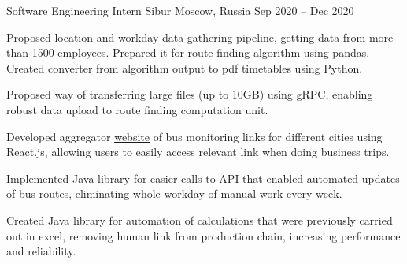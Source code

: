 \begin{cventries}
  \cventry
  {Software Engineering Intern} %
  {Sibur} %
  {Moscow, Russia} %
  {Sep 2020 -- Dec 2020} %
  {
    \begin{cvitems} %
      \item Proposed location and workday data gathering pipeline, getting data from more than 1500 employees. Prepared it for route finding algorithm using pandas. Created converter from algorithm output to pdf timetables using Python.
      \item Proposed way of transferring large files (up to 10GB) using gRPC, enabling robust data upload to route finding computation unit.
      \item Developed aggregator \href{https://www.sibur.ru/bus/}{website} of bus monitoring links for different cities using React.js, allowing users to easily access relevant link when doing business trips.
      \item Implemented Java library for easier calls to API that enabled automated updates of bus routes, eliminating whole workday of manual work every week.
      \item Created Java library for automation of calculations that were previously carried out in excel, removing human link from production chain, increasing performance and reliability.
    \end{cvitems}
  }

\end{cventries}

